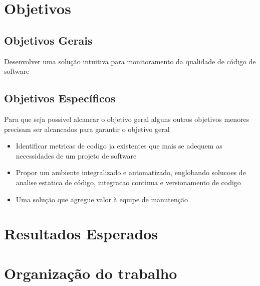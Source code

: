 	\section{Objetivos}

	\subsection{Objetivos Gerais} %
	\label{sub:objetivos_gerais}
	
		Desenvolver uma solução intuitiva para monitoramento da qualidade de código de software


	\subsection{Objetivos Específicos} %
	\label{sub:objetivos_específicos}

	Para que seja possivel alcancar o objetivo geral alguns outros objetivos menores precisam ser alcancados para garantir  o objetivo geral 
		 
	\begin{itemize}
		\item Identificar metricas de codigo ja existentes que mais se adequem as necessidades de um projeto de software 
		\item Propor um ambiente integralizado e automatizado, englobando solucoes de analise estatica de código, integracao continua e versionamento de codigo
		\item Uma solução que agregue valor à equipe de manutenção 
	\end{itemize}
	



	\section{Resultados Esperados}

	\section{Organização do trabalho} %
	\label{sec:organização_do_trabalho}
		
